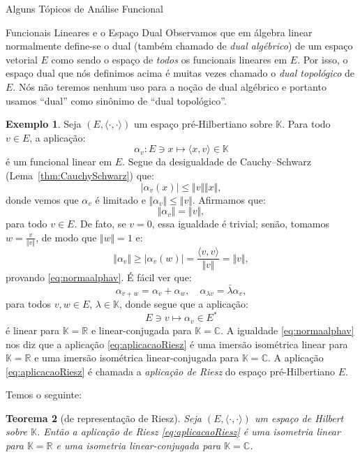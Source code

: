 \documentclass[oneside,final,11pt]{amsbook}
\newcommand{\R}{\mathds R}
\newcommand{\C}{\mathds C}
\newcommand{\K}{\mathds K}
\theoremstyle{remark}\newtheorem{exercise}{Exercício}[chapter]
\theoremstyle{remark}\newtheorem{*exercise}[exercise]{\hbox to 0pt{\hskip 0pt minus 1fil*}Exercício}
\theoremstyle{definition}\newtheorem{exdefin}{Definição}[chapter]
\theoremstyle{plain}\newtheorem{teo}{Teorema}[section]
\theoremstyle{plain}\newtheorem{lem}[teo]{Lema}
\theoremstyle{plain}\newtheorem{prop}[teo]{Proposição}
\theoremstyle{plain}\newtheorem{cor}[teo]{Corolário}
\theoremstyle{definition}\newtheorem{defin}[teo]{Definição}
\theoremstyle{remark}\newtheorem{rem}[teo]{Observação}
\theoremstyle{definition}\newtheorem{notation}[teo]{Notação}
\theoremstyle{definition}\newtheorem{convention}[teo]{Convenção}
\theoremstyle{definition}\newtheorem{example}[teo]{Exemplo}
\numberwithin{section}{chapter}
\numberwithin{equation}{section}
\begin{document}
\begin{chapter}{Alguns Tópicos de Análise Funcional}
\begin{section}{Funcionais Lineares e o Espaço Dual}
Observamos que em álgebra linear normalmente define-se o dual (tam\-bém
chamado de {\em dual algébrico}) de um espaço vetorial
$E$ como sendo o espaço de {\em todos\/} os funcionais lineares em $E$. Por isso,
o espaço dual que nós definimos acima é muitas vezes chamado o {\em dual topológico\/}
de $E$. Nós não teremos nenhum uso para a noção de dual algébrico e portanto usamos
``dual'' como sinônimo de ``dual topológico''.

\begin{example}
Seja $(E,\langle\cdot,\cdot\rangle)$ um espaço pré-Hilbertiano sobre $\K$. Para todo
$v\in E$, a aplicação:
\[\alpha_v:E\ni x\longmapsto\langle x,v\rangle\in\K\]
é um funcional linear em $E$. Segue da desigualdade de Cauchy--Schwarz (Lema~\ref{thm:CauchySchwarz})
que:
\[\big\vert\alpha_v(x)\big\vert\le\Vert v\Vert\Vert x\Vert,\]
donde vemos que $\alpha_v$ é limitado e $\Vert\alpha_v\Vert\le\Vert v\Vert$.
Afirmamos que:
\begin{equation}\label{eq:normaalphav}
\Vert\alpha_v\Vert=\Vert v\Vert,
\end{equation}
para todo $v\in E$. De fato, se $v=0$, essa igualdade é trivial; senão, tomamos
$w=\frac v{\Vert v\Vert}$, de modo que $\Vert w\Vert=1$ e:
\[\Vert\alpha_v\Vert\ge\big\vert\alpha_v(w)\big\vert=\frac{\langle v,v\rangle}{\Vert v\Vert}
=\Vert v\Vert,\]
provando \eqref{eq:normaalphav}. É fácil ver que:
\[\alpha_{v+w}=\alpha_v+\alpha_w,\quad\alpha_{\lambda v}=\bar\lambda\alpha_v,\]
para todos $v,w\in E$, $\lambda\in\K$, donde segue que a aplicação:
\begin{equation}\label{eq:aplicacaoRiesz}
E\ni v\longmapsto\alpha_v\in E^*
\end{equation}
é linear para $\K=\R$ e linear-conjugada para $\K=\C$. A igualdade \eqref{eq:normaalphav} nos diz que
a aplicação \eqref{eq:aplicacaoRiesz} é uma imersão isométrica linear para $\K=\R$ e uma imersão isométrica
linear-conjugada para $\K=\C$. A aplicação \eqref{eq:aplicacaoRiesz} é chamada a
{\em aplicação de Riesz\/}
do espaço pré-Hilbertiano $E$.
\end{example}

Temos o seguinte:
\begin{teo}[de representação de Riesz]%
\label{thm:RieszHilbert}
Seja $(E,\langle\cdot,\cdot\rangle)$ um espaço de Hilbert sobre $\K$. Então a aplicação de Riesz
\eqref{eq:aplicacaoRiesz} é uma isometria linear para $\K=\R$ e uma isometria linear-conjugada para $\K=\C$.
\end{teo}


\end{section}
\end{chapter}
\end{document}
